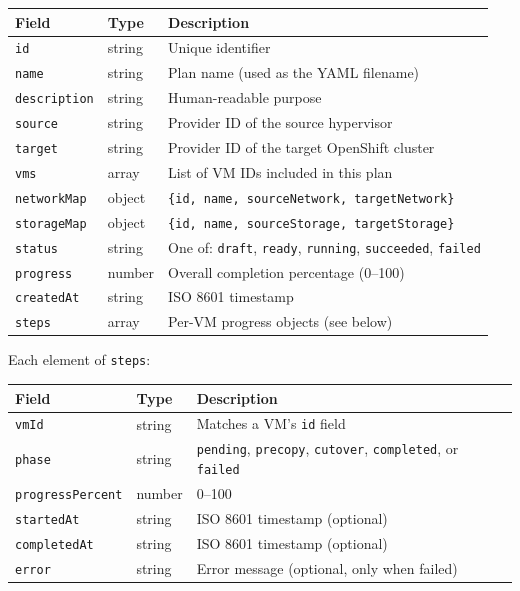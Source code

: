 \documentclass[12pt,a4paper]{article}
\begin{document}
\begin{center}
\begin{tabular}{llL{6.5cm}}
  \toprule
  \textbf{Field} & \textbf{Type} & \textbf{Description} \\
  \midrule
  \texttt{id}          & string & Unique identifier \\
  \texttt{name}        & string & Plan name (used as the YAML filename) \\
  \texttt{description} & string & Human-readable purpose \\
  \texttt{source}      & string & Provider ID of the source hypervisor \\
  \texttt{target}      & string & Provider ID of the target OpenShift cluster \\
  \texttt{vms}         & array  & List of VM IDs included in this plan \\
  \texttt{networkMap}  & object & \texttt{\{id, name, sourceNetwork, targetNetwork\}} \\
  \texttt{storageMap}  & object & \texttt{\{id, name, sourceStorage, targetStorage\}} \\
  \texttt{status}      & string & One of: \texttt{draft}, \texttt{ready}, \texttt{running}, \texttt{succeeded}, \texttt{failed} \\
  \texttt{progress}    & number & Overall completion percentage (0--100) \\
  \texttt{createdAt}   & string & ISO 8601 timestamp \\
  \texttt{steps}       & array  & Per-VM progress objects (see below) \\
  \bottomrule
\end{tabular}
\end{center}

Each element of \texttt{steps}:

\begin{center}
\begin{tabular}{llL{6cm}}
  \toprule
  \textbf{Field} & \textbf{Type} & \textbf{Description} \\
  \midrule
  \texttt{vmId}            & string & Matches a VM's \texttt{id} field \\
  \texttt{phase}           & string & \texttt{pending}, \texttt{precopy}, \texttt{cutover}, \texttt{completed}, or \texttt{failed} \\
  \texttt{progressPercent} & number & 0--100 \\
  \texttt{startedAt}       & string & ISO 8601 timestamp (optional) \\
  \texttt{completedAt}     & string & ISO 8601 timestamp (optional) \\
  \texttt{error}           & string & Error message (optional, only when failed) \\
  \bottomrule
\end{tabular}
\end{center}
\end{document}
